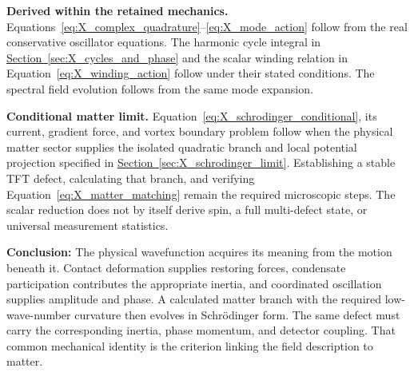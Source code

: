 \medskip
\noindent\textbf{Derived within the retained mechanics.}
Equations~\eqref{eq:X_complex_quadrature}--\eqref{eq:X_mode_action} follow from the real conservative oscillator equations. The harmonic cycle integral in \hyperref[sec:X_cycles_and_phase]{Section~\ref*{sec:X_cycles_and_phase}} and the scalar winding relation in Equation~\eqref{eq:X_winding_action} follow under their stated conditions. The spectral field evolution follows from the same mode expansion.

\medskip
\noindent\textbf{Conditional matter limit.}
Equation~\eqref{eq:X_schrodinger_conditional}, its current, gradient force, and vortex boundary problem follow when the physical matter sector supplies the isolated quadratic branch and local potential projection specified in \hyperref[sec:X_schrodinger_limit]{Section~\ref*{sec:X_schrodinger_limit}}. Establishing a stable TFT defect, calculating that branch, and verifying Equation~\eqref{eq:X_matter_matching} remain the required microscopic steps. The scalar reduction does not by itself derive spin, a full multi-defect state, or universal measurement statistics.

\medskip
\noindent\textbf{Conclusion:}
The physical wavefunction acquires its meaning from the motion beneath it. Contact deformation supplies restoring forces, condensate participation contributes the appropriate inertia, and coordinated oscillation supplies amplitude and phase. A calculated matter branch with the required low-wave-number curvature then evolves in Schr\"{o}dinger form. The same defect must carry the corresponding inertia, phase momentum, and detector coupling. That common mechanical identity is the criterion linking the field description to matter.
